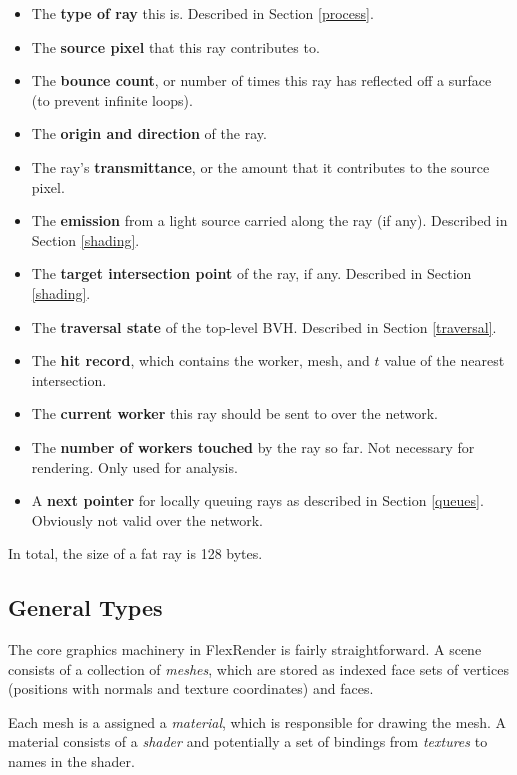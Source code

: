 \documentclass[12pt]{ucthesis}
\begin{document}
\begin{itemize}
    \item The \textbf{type of ray} this is. Described in Section \ref{process}.
    \item The \textbf{source pixel} that this ray contributes to.
    \item The \textbf{bounce count}, or number of times this ray has reflected
        off a surface (to prevent infinite loops).
    \item The \textbf{origin and direction} of the ray.
    \item The ray's \textbf{transmittance}, or the amount that it contributes
        to the source pixel.
    \item The \textbf{emission} from a light source carried along the ray (if
        any). Described in Section \ref{shading}.
    \item The \textbf{target intersection point} of the ray, if any. Described
        in Section \ref{shading}.
    \item The \textbf{traversal state} of the top-level BVH. Described in
        Section \ref{traversal}.
    \item The \textbf{hit record}, which contains the worker, mesh, and $t$
        value of the nearest intersection.
    \item The \textbf{current worker} this ray should be sent to over the
        network.
    \item The \textbf{number of workers touched} by the ray so far. Not
        necessary for rendering. Only used for analysis.
    \item A \textbf{next pointer} for locally queuing rays as described in
        Section \ref{queues}. Obviously not valid over the network.
\end{itemize}

In total, the size of a fat ray is 128 bytes.

\subsection{General Types}
\label{types}

The core graphics machinery in FlexRender is fairly straightforward. A scene consists
of a collection of \emph{meshes}, which are stored as indexed face sets of vertices
(positions with normals and texture coordinates) and faces.

Each mesh is a assigned a \emph{material}, which is responsible for drawing the
mesh. A material consists of a \emph{shader} and potentially a set of bindings
from \emph{textures} to names in the shader.
\end{document}
